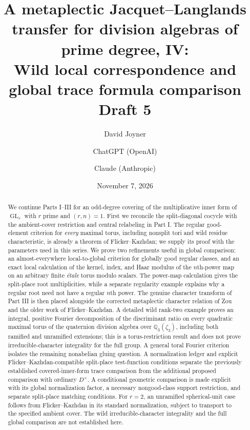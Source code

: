 \documentclass[11pt]{article}
\title{A metaplectic Jacquet--Langlands transfer for division algebras of prime degree, IV:\\
Wild local correspondence and global trace formula comparison\\[0.4em]\normalsize Draft 5}
\author{David Joyner \and ChatGPT (OpenAI) \and Claude (Anthropic)}
\date{November 7, 2026}
\newcommand{\GL}{\operatorname{GL}}
\theoremstyle{plain}
\theoremstyle{definition}
\begin{document}
\maketitle
\begin{abstract}
We continue Parts I--III for an odd-degree covering of the multiplicative
inner form of $\GL_r$ with $r$ prime and $(r,n)=1$.  First we reconcile the
split-diagonal cocycle with the ambient-cover restriction and central
relabeling in Part I.  The regular good-element criterion for \emph{every}
maximal torus, including nonsplit tori and wild residue characteristic,
is already a theorem of Flicker--Kazhdan; we supply its proof with the
parameters used in this series.  We prove two refinements useful in global
comparison: an almost-everywhere local-to-global criterion for globally
good regular classes, and an exact local calculation of the kernel, index,
and Haar modulus of the $n$th-power map on an arbitrary finite \emph{\'etale}
torus modulo scalars.  The power-map calculation gives the split-place
root multiplicities, while a separate regularity example explains why a
regular root need not have a regular $n$th power.  The genuine character transform of Part III
is then placed alongside the corrected metaplectic character relation of
Zou and the older work of Flicker--Kazhdan.  A detailed wild rank-two example proves an integral, positive
Fourier decomposition of the discriminant ratio on every quadratic
maximal torus of the quaternion division algebra over
$\mathbb Q_3(\zeta_3)$, including both ramified and unramified
extensions; this is a torus-restriction result and does not prove
irreducible-character integrality for the full group. A general toral
Fourier criterion isolates the remaining nonabelian gluing question.
A normalization ledger and explicit Flicker--Kazhdan-compatible
split-place test-function conditions separate the previously established
covered-inner-form trace comparison from the additional proposed
comparison with ordinary $D^\times$.  A conditional geometric comparison is made explicit with its global
normalization factor, a necessary nongood-class support restriction,
and separate split-place matching conditions.  For $r=2$, an
unramified spherical-unit case follows from Flicker--Kazhdan in its
standard normalization, subject to transport to the specified ambient
cover. The wild irreducible-character integrality and the full global
comparison are not established here.
\end{abstract}
\tableofcontents
\end{document}
